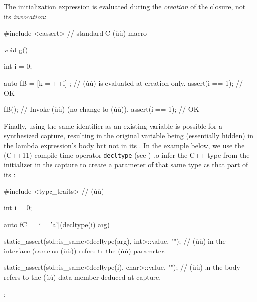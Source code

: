 \noindent The initialization expression is evaluated during the \emph{creation} of
the closure, not its \emph{invocation}:

\begin{emcppslisting}[emcppsstandards={c++14}]
#include <cassert>  // standard C (ù{}ù) macro

void g()
{
    int i = 0;

    auto fB = [k = ++i]{ };  // (ù{}ù) is evaluated at creation only.
    assert(i == 1);  // OK

    fB();  // Invoke (ù{}ù) (no change to (ù{}ù)).
    assert(i == 1);  // OK
}
\end{emcppslisting}
    
\noindent Finally, using the same identifier as an existing
variable is possible for a synthesized capture, resulting in the original variable
being  (essentially hidden) in the lambda expression's
body but not in its . In the example below,
we use the (C++11) compile-time operator
\lstinline!decltype! (see ) to infer the C++ type from the
initializer in the capture to create a parameter of that same type as
that part of its :

\begin{emcppslisting}[emcppserrorlines={10},emcppsstandards={c++14}]
#include <type_traits>  // (ù{}ù)

int i = 0;

auto fC = [i = 'a'](decltype(i) arg)
{
    static_assert(std::is_same<decltype(arg), int>::value, "");
         // (ù{}ù) in the interface (same as (ù{}ù)) refers to the (ù{}ù) parameter.

    static_assert(std::is_same<decltype(i), char>::value, "");
        // (ù{}ù) in the body refers to the (ù{}ù) data member deduced at capture.
};
\end{emcppslisting}
    
